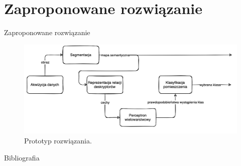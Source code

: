 \documentclass[10pt]{beamer}
\begin{document}
\section[Zaproponowane rozwiązanie]{Zaproponowane rozwiązanie}
\begin{frame}{Zaproponowane rozwiązanie}

    \begin{figure}
        \includegraphics[width=\textwidth]{images/own-solution.png}
        \caption{Prototyp rozwiązania.}
    \end{figure}
\end{frame}

\begin{frame}[allowframebreaks]{Bibliografia}

    
    
  
  \end{frame}

\end{document}
